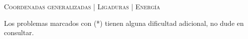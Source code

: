 \documentclass[11pt, spanish, a4paper, twoside]{article}
\begin{document}
\begin{center}
  \textsc{\large Coordenadas generalizadas | Ligaduras | Energía}
\end{center}

\noindent
Los problemas marcados con (*) tienen alguna dificultad adicional, no dude en consultar.
\begin{enumerate}







\end{enumerate}
\end{document}
